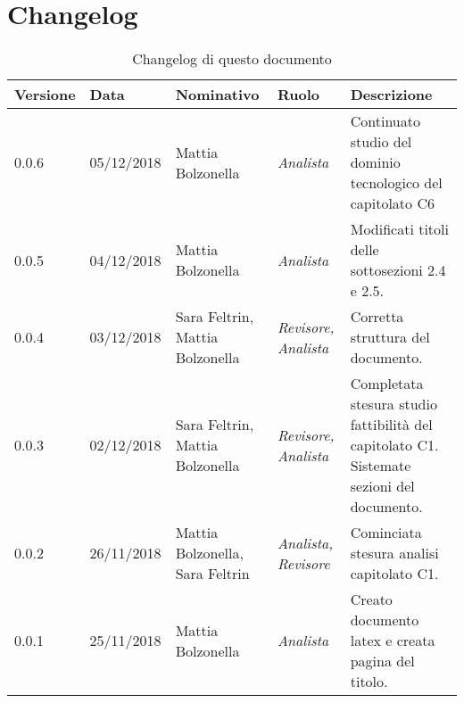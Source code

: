 \section{Changelog}
\begin{table}[tbph]
        \centering
        \begin{tabularx}{\textwidth}{|l|l|l|l|X|}
                \hline
                \textbf{Versione} & \textbf{Data} & \textbf{Nominativo}  & \textbf{Ruolo} & 
                \textbf{Descrizione}\\
              	\hline \hline
              	0.0.6 & 05/12/2018 & Mattia Bolzonella & \textit{Analista} & 
              	Continuato studio del dominio tecnologico del capitolato C6\\
              	\hline
              	0.0.5 & 04/12/2018 & Mattia Bolzonella & \textit{Analista} & 
              	Modificati titoli delle sottosezioni 2.4 e 2.5. \\
              	\hline
              	0.0.4 & 03/12/2018 & Sara Feltrin, Mattia Bolzonella 
              	& \textit{Revisore, Analista} & Corretta struttura del documento. \\
              	\hline
              	0.0.3 & 02/12/2018 & Sara Feltrin, Mattia Bolzonella & \textit{Revisore, Analista}
              	& Completata stesura studio fattibilità del capitolato C1.
              	Sistemate sezioni del documento. \\
              	\hline
              	0.0.2 & 26/11/2018 & Mattia Bolzonella, Sara Feltrin & \textit{Analista, Revisore}
              	& Cominciata stesura analisi capitolato C1.\\
                \hline
                0.0.1 & 25/11/2018 & Mattia Bolzonella & \textit{Analista}
                & Creato documento latex e creata pagina del titolo.\\
                \hline
              	
        \end{tabularx}
        \caption{Changelog di questo documento}
\end{table}